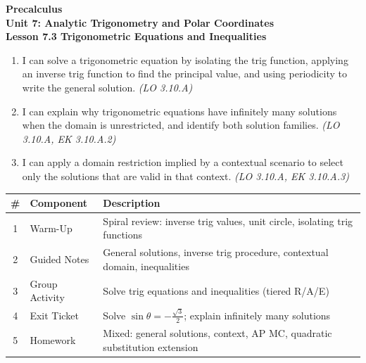 \documentclass[10pt]{article}
\begin{document}
\vspace{-0.8in}

\begin{center}
  {\color{white}\textbf{\LARGE Precalculus}}\\[4pt]
  {\color{skymid}\large\textbf{Unit 7: Analytic Trigonometry and Polar Coordinates}}\\[6pt]
  {\color{white}\textbf{\large Lesson 7.3 \quad Trigonometric Equations and Inequalities}}
\end{center}

\vspace{0.22in}
\namedateperiod
\vspace{0.18in}

\begin{learningtargetbox}
\small
\begin{enumerate}[leftmargin=1.5em, itemsep=5pt]
  \item I can solve a trigonometric equation by isolating the trig function,
    applying an inverse trig function to find the principal value, and using
    periodicity to write the general solution. \hfill\textit{(LO 3.10.A)}
  \item I can explain why trigonometric equations have infinitely many solutions
    when the domain is unrestricted, and identify both solution families.
    \hfill\textit{(LO 3.10.A, EK 3.10.A.2)}
  \item I can apply a domain restriction implied by a contextual scenario to
    select only the solutions that are valid in that context.
    \hfill\textit{(LO 3.10.A, EK 3.10.A.3)}
\end{enumerate}
\end{learningtargetbox}

\vspace{0.14in}

\begin{tocbox}
\small
\renewcommand{\arraystretch}{1.5}
\begin{tabularx}{\linewidth}{@{} c l X @{}}
\rowcolor{sky}
\textbf{\#} & \textbf{Component} & \textbf{Description} \\
\midrule
1 & Warm-Up        & Spiral review: inverse trig values, unit circle, isolating trig functions \\
2 & Guided Notes   & General solutions, inverse trig procedure, contextual domain, inequalities \\
3 & Group Activity & Solve trig equations and inequalities (tiered R/A/E) \\
4 & Exit Ticket    & Solve $\sin\theta = -\tfrac{\sqrt{3}}{2}$; explain infinitely many solutions \\
5 & Homework       & Mixed: general solutions, context, AP MC, quadratic substitution extension \\
\end{tabularx}
\end{tocbox}
\end{document}
